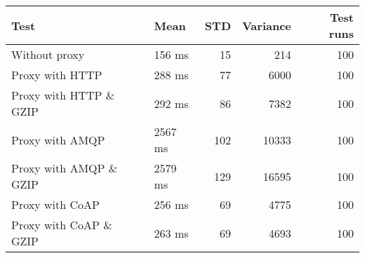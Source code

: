 \begin{tabularx}{\textwidth}{llrrr}
\hline
 Test                   & Mean    &   STD &   Variance &   Test runs \\
\hline
 Without proxy          & 156 ms  &    15 &        214 &         100 \\
 Proxy with HTTP        & 288 ms  &    77 &       6000 &         100 \\
 Proxy with HTTP \& GZIP & 292 ms  &    86 &       7382 &         100 \\
 Proxy with AMQP        & 2567 ms &   102 &      10333 &         100 \\
 Proxy with AMQP \& GZIP & 2579 ms &   129 &      16595 &         100 \\
 Proxy with CoAP        & 256 ms  &    69 &       4775 &         100 \\
 Proxy with CoAP \& GZIP & 263 ms  &    69 &       4693 &         100 \\
\hline
\end{tabularx}